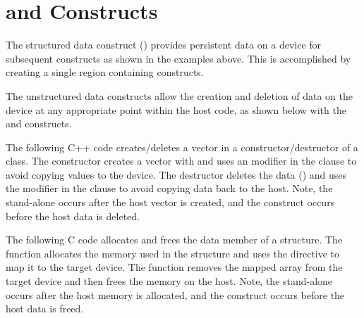 \section{ and  Constructs}
\label{sec:target_enter_exit_data}

The structured data construct () provides persistent data on a
device for subsequent  constructs as shown in the 
 examples above. This is accomplished by creating a single
 region containing  constructs.

The unstructured data constructs allow the creation and deletion of data on
the device at any appropriate point within the host code, as shown below 
with the  and  constructs.

The following C++ code creates/deletes a vector in a constructor/destructor 
of a class. The constructor creates a vector with 
and uses an  modifier in the  clause to avoid copying values
to the device. The destructor deletes the data ()
and uses the  modifier in the  clause to avoid copying data
back to the host. Note, the stand-alone  occurs 
after the host vector is created, and the 
construct occurs before the host data is deleted.


The following C code allocates and frees the data member of a  structure.
The  function allocates the memory used in the structure and
uses the  directive to map it to the target device. The
 function removes the mapped array from the target device
and then frees the memory on the host.  Note, the stand-alone 
 occurs after the host memory is allocated, and the 
 construct occurs before the host data is freed.

